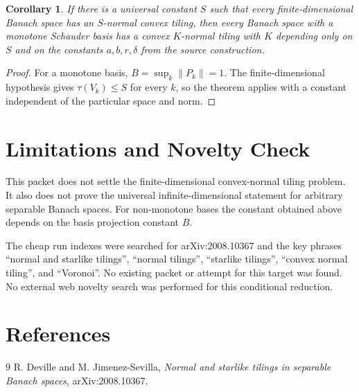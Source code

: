 \documentclass[11pt]{article}
\newtheorem{corollary}{Corollary}
\begin{document}
\begin{corollary}
If there is a universal constant $S$ such that every finite-dimensional Banach
space has an $S$-normal convex tiling, then every Banach space with a monotone
Schauder basis has a convex $K$-normal tiling with $K$ depending only on $S$
and on the constants $a,b,r,\delta$ from the source construction.
\end{corollary}

\begin{proof}
For a monotone basis, $B=\sup_k\|P_k\|=1$. The finite-dimensional hypothesis
gives $\tau(V_k)\le S$ for every $k$, so the theorem applies with a constant
independent of the particular space and norm.
\end{proof}

\section*{Limitations and Novelty Check}

This packet does not settle the finite-dimensional convex-normal tiling
problem. It also does not prove the universal infinite-dimensional statement
for arbitrary separable Banach spaces. For non-monotone bases the constant
obtained above depends on the basis projection constant $B$.

The cheap run indexes were searched for arXiv:2008.10367 and the key phrases
``normal and starlike tilings'', ``normal tilings'', ``starlike tilings'',
``convex normal tiling'', and ``Voronoi''. No existing packet or attempt for
this target was found. No external web novelty search was performed for this
conditional reduction.

\section*{References}

\begin{thebibliography}{9}
R. Deville and M. Jimenez-Sevilla,
\emph{Normal and starlike tilings in separable Banach spaces},
arXiv:2008.10367.
\end{thebibliography}
\end{document}
